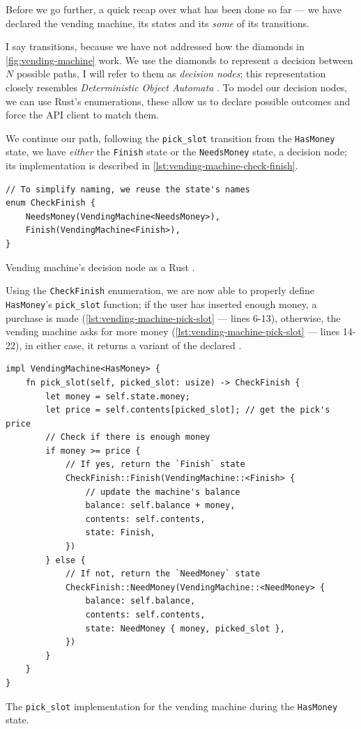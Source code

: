 Before we go further, a quick recap over what has been done so far ---
we have declared the vending machine, its states and its \emph{some} of its transitions.

I say  transitions, because we have not addressed how the diamonds in \autoref{fig:vending-machine} work.
We use the diamonds to represent a decision between $N$ possible paths, I will refer to them as \emph{decision nodes};
this representation closely resembles \emph{Deterministic Object Automata} \cite{Trindade2020}.
To model our decision nodes, we can use Rust's enumerations,
these allow us to declare possible outcomes and force the \gls{API} client to match them.

We continue our path, following the \texttt{pick\_slot} transition from the \texttt{HasMoney} state,
we have \emph{either} the \texttt{Finish} state or the \texttt{NeedsMoney} state,
a decision node; its implementation is described in \autoref{lst:vending-machine-check-finish}.

\begin{listing}
    \begin{verbatim}
// To simplify naming, we reuse the state's names
enum CheckFinish {
    NeedsMoney(VendingMachine<NeedsMoney>),
    Finish(VendingMachine<Finish>),
}
\end{verbatim}
    \caption{Vending machine's decision node as a Rust .}
    \label{lst:vending-machine-check-finish}
\end{listing}

Using the \texttt{CheckFinish} enumeration, we are now able to properly define \texttt{HasMoney}'s \texttt{pick\_slot} function;
if the user has inserted enough money, a purchase is made (\autoref{lst:vending-machine-pick-slot} --- lines 6-13),
otherwise, the vending machine asks for more money (\autoref{lst:vending-machine-pick-slot} --- lines 14-22),
in either case, it returns a variant of the declared .

\begin{listing}
    \begin{verbatim}
impl VendingMachine<HasMoney> {
    fn pick_slot(self, picked_slot: usize) -> CheckFinish {
        let money = self.state.money;
        let price = self.contents[picked_slot]; // get the pick's price
        // Check if there is enough money
        if money >= price {
            // If yes, return the `Finish` state
            CheckFinish::Finish(VendingMachine::<Finish> {
                // update the machine's balance
                balance: self.balance + money,
                contents: self.contents,
                state: Finish,
            })
        } else {
            // If not, return the `NeedMoney` state
            CheckFinish::NeedMoney(VendingMachine::<NeedMoney> {
                balance: self.balance,
                contents: self.contents,
                state: NeedMoney { money, picked_slot },
            })
        }
    }
}
\end{verbatim}
    \caption{The \texttt{pick\_slot} implementation for the vending machine during the \texttt{HasMoney} state.}
    \label{lst:vending-machine-pick-slot}
\end{listing}

